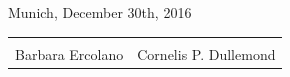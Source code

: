 \documentclass[10pt,fleqn,twoside]{article}
\begin{document}
\noindent Munich, December 30th, 2016\\[1em]

\noindent\begin{tabular}{p{5.5cm}p{5.5cm}}
\vspace{1em} & \\
Barbara Ercolano & Cornelis P. Dullemond \\
\end{tabular}
% 



%
\pagebreak[4]



\end{document}
